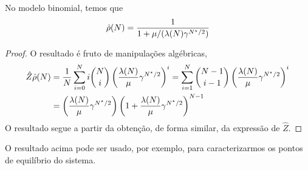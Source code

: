         \begin{lemma}
        No modelo binomial,  temos que 
        	\begin{equation}
				\hat{\rho}(N) =   \frac{1}  {1+ \mu/(\lambda(N) \gamma^{N^{\star}/2} )  } \\
        	\end{equation}
        \end{lemma}	
        \begin{proof}	
            O resultado é fruto de manipulações algébricas,
            \begin{align}
            \hat{Z} \hat{\rho}(N) &= \frac{1}{N} \sum_{i=0}^N i \binom{N}{i} \left( \frac{\lambda(N)}{\mu}\gamma^{N^{\star}/2} \right)^i = \sum_{i=1}^N\binom{N-1}{i-1}\left(\frac{\lambda(N)}{\mu}\gamma^{N^{\star}/2}\right)^i \label{eq:binom_mirror} \\
            &= \color{black}{\left(\frac{\lambda(N)}{\mu}\gamma^{N^{\star}/2}\right)\left(1+\frac{\lambda(N)}{\mu}\gamma^{N^{\star}/2}\right)^{N-1}} \label{eq:thm_binom} %
            \end{align}
            O resultado segue a partir da obtenção, de forma similar, da  expressão de $\hat{Z}$. 
        \end{proof}
        O resultado acima pode ser usado, por exemplo, para caracterizarmos os pontos de equilíbrio do sistema.

